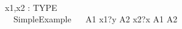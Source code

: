 \begin{circus}%
[TYPE]\\
\circchannel x1,x2 : TYPE\\
 \circprocess\ ~SimpleExample ~\circdef~\circbegin
  A1 \circdef x1?y \then \Skip
  A2 \circdef x2?x \then \Skip
  \circspot  A1 \intchoice A2
  \circend
\end{circus}